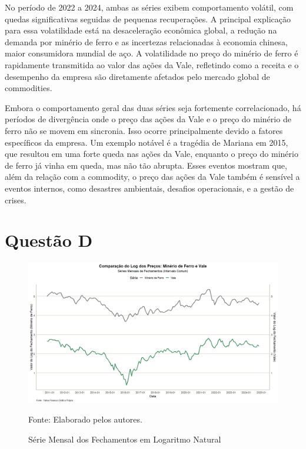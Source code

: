 \documentclass[a4paper,12pt]{article}[abntex2]
\begin{document}
No período de 2022 a 2024, ambas as séries exibem comportamento volátil, com quedas significativas seguidas de pequenas recuperações. A principal explicação para essa volatilidade está na desaceleração econômica global, a redução na demanda por minério de ferro e as incertezas relacionadas à economia chinesa, maior consumidora mundial de aço. A volatilidade no preço do minério de ferro é rapidamente transmitida ao valor das ações da Vale, refletindo como a receita e o desempenho da empresa são diretamente afetados pelo mercado global de commodities.

Embora o comportamento geral das duas séries seja fortemente correlacionado, há períodos de divergência onde o preço das ações da Vale e o preço do minério de ferro não se movem em sincronia. Isso ocorre principalmente devido a fatores específicos da empresa. Um exemplo notável é a tragédia de Mariana em 2015, que resultou em uma forte queda nas ações da Vale, enquanto o preço do minério de ferro já vinha em queda, mas não tão abrupta. Esses eventos mostram que, além da relação com a commodity, o preço das ações da Vale também é sensível a eventos internos, como desastres ambientais, desafios operacionais, e a gestão de crises.

\section*{\textbf{Questão D}}

\begin{figure}[H]
    \centering
    \caption{Série Mensal dos Fechamentos em Logaritmo Natural} 
    \includegraphics[width=1.0\textwidth]{APS 2/i1qD.png}
    \label{fig:i1qD}
    
    \footnotesize{Fonte: Elaborado pelos autores.}
    \end{figure}
\end{document}
